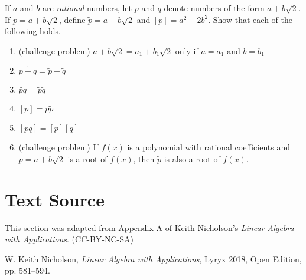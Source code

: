 \documentclass{ximera}
\begin{document}
\begin{problem}\label{prb:A.29}
If $a$ and $b$ are \textit{rational} numbers, let $p$ and $q$ denote numbers of the form $a + b\sqrt{2}$. If $p = a + b\sqrt{2}$, define $\tilde{p} = a-b\sqrt{2}$ and $[p] = a^{2} - 2b^{2}$. Show that each of the following holds.

\begin{enumerate}
\item (challenge problem) $a + b\sqrt{2} = a_{1} + b_{1}\sqrt{2}$ only if $a = a_{1}$ and $b = b_{1}$
\item $\widetilde{p \pm q} = \tilde{p} \pm \tilde{q}$
\item $\widetilde{pq} = \tilde{p}\tilde{q}$
\item $[p] = p \tilde{p}$
\item $[pq] = [p][q]$
\item (challenge problem) If $f(x)$ is a polynomial with rational coefficients and $p = a + b\sqrt{2}$ is a root of $f(x)$, then $\tilde{p}$
 is also a root of $f(x)$.
\end{enumerate}
\end{problem}

\section*{Text Source} This section was adapted from Appendix A of Keith Nicholson's \href{https://open.umn.edu/opentextbooks/textbooks/linear-algebra-with-applications}{\it Linear Algebra with Applications}. (CC-BY-NC-SA)

W. Keith Nicholson, {\it Linear Algebra with Applications}, Lyryx 2018, Open Edition, pp. 581--594.
\end{document}
